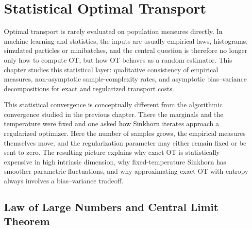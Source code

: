 
\chapter{Statistical Optimal Transport}
\label{sec-statistical-ot}

Optimal transport is rarely evaluated on population measures directly.  In machine learning and statistics, the inputs are usually empirical laws, histograms, simulated particles or minibatches, and the central question is therefore no longer only how to compute OT, but how OT behaves as a random estimator.  This chapter studies this statistical layer: qualitative consistency of empirical measures, non-asymptotic sample-complexity rates, and asymptotic bias--variance decompositions for exact and regularized transport costs.

This statistical convergence is conceptually different from the algorithmic convergence studied in the previous chapter.  There the marginals and the temperature were fixed and one asked how Sinkhorn iterates approach a regularized optimizer.  Here the number of samples grows, the empirical measures themselves move, and the regularization parameter may either remain fixed or be sent to zero.  The resulting picture explains why exact OT is statistically expensive in high intrinsic dimension, why fixed-temperature Sinkhorn has smoother parametric fluctuations, and why approximating exact OT with entropy always involves a bias--variance tradeoff.

\section{Law of Large Numbers and Central Limit Theorem}
\label{sec-law-large-numbers-clt}
\label{sec-quantitative-clt}


